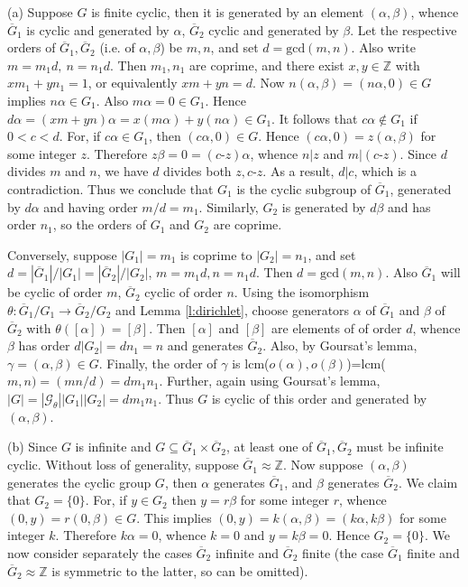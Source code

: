 \documentclass[11pt]{article}
\theoremstyle{change}
\newcommand{\<}{\langle}
\renewcommand{\>}{\rangle}
\begin{document}
(a)  Suppose $G$ is finite cyclic, then it is generated by an element $(\alpha,\beta)$, whence $\overline{G}_1$ is cyclic and generated by $\alpha$, $\overline{G}_2$ cyclic and generated by $\beta$. Let the respective orders of $\overline{G}_1,\overline{G}_2$ (i.e. of $\alpha,\beta$) be $m,n$, and set $d=\mbox{gcd}(m,n)$. Also write $m=m_1d,~n=n_1d$. Then $m_1,n_1$ are coprime, and there exist $x,y\in \mathbb{Z}$ with $xm_1+yn_1=1$, or equivalently $xm+yn=d$. Now $n(\alpha,\beta)=(n\alpha,0)\in G$ implies $n\alpha\in G_1$. Also $m\alpha=0\in G_1$. Hence $d\alpha=(xm+yn)\alpha=x(m\alpha)+y(n\alpha)\in G_1$. It follows that $c\alpha\notin G_1$ if $0<c<d$. For, if $c\alpha\in G_1$, then $(c\alpha,0)\in G$. Hence $(c\alpha,0)=z(\alpha,\beta)$ for some integer $z$. Therefore $z\beta=0=(c\mbox{-}z)\alpha$, whence $n|z$ and $m|(c\mbox{-}z)$. Since $d$ divides $m$ and $n$, we have $d$ divides both $z,c\mbox{-}z$. As a result, $d|c$, which is a contradiction. Thus we conclude that $G_1$ is the cyclic subgroup of $\overline{G}_1$, generated by $d\alpha$ and having order $m/d=m_1$. Similarly, $G_2$ is generated by $d\beta$ and has order $n_1$, so the orders of $G_1$ and $G_2$ are coprime.

Conversely, suppose $|G_1|=m_1$ is coprime to $|G_2|=n_1$, and set $d=|\overline{G}_1|/|G_1|=|\overline{G}_2|/|G_2|$, $m=m_1d,n=n_1d$. Then $d=\mbox{gcd}(m,n)$. Also $\overline{G}_1$ will be cyclic of order $m$, $\overline{G}_2$ cyclic of order $n$. Using the isomorphism $\theta\colon \overline{G}_1/G_1\rightarrow \overline{G}_2/G_2$ and Lemma \ref{l:dirichlet}, choose  generators $\alpha$ of $\overline{G}_1$ and $\beta$ of  $\overline{G}_2$ with $\theta([\alpha])=[\beta]$. Then  $[\alpha]$ and $[\beta]$ are elements of of order $d$, whence $\beta$ has order $d|G_2|=dn_1=n$ and generates $\overline{G}_2$. Also, by Goursat's lemma, $\gamma=(\alpha,\beta)\in G$. Finally, the order of $\gamma$ is lcm($o(\alpha),o(\beta)$)=lcm($m,n)=(mn/d)=dm_1n_1$. Further, again using Goursat's lemma, $|G|=|\mathcal{G}_{\theta}||G_1||G_2|=dm_1n_1$. Thus $G$ is cyclic of this order and generated by $(\alpha,\beta)$.

(b) Since $G$ is infinite and $G\subseteq \overline{G}_1\times \overline{G}_2$, at least one of $\overline{G}_1,\overline{G}_2$ must be infinite cyclic. Without loss of generality, suppose $\overline{G}_1\approx \mathbb{Z}$. Now suppose $(\alpha,\beta)$ generates the cyclic group $G$, then $\alpha$ generates $\overline{G}_1$, and $\beta$ generates $\overline{G}_2$. We claim that $G_2=\{0\}$. For, if $y\in G_2$ then $y=r\beta$ for some integer $r$, whence $(0,y)=r(0,\beta)\in G$. This implies $(0,y)=k(\alpha,\beta)=(k\alpha,k\beta)$ for some integer $k$. Therefore $k\alpha=0$, whence $k=0$ and $y=k\beta=0$. Hence $G_2=\{0\}.$ We now consider separately the cases $\overline{G}_2$ infinite and $\overline{G}_2$ finite (the case $\overline{G}_1$ finite and $\overline{G}_2\approx \mathbb{Z}$ is symmetric to the latter, so can be omitted).
\end{document}
